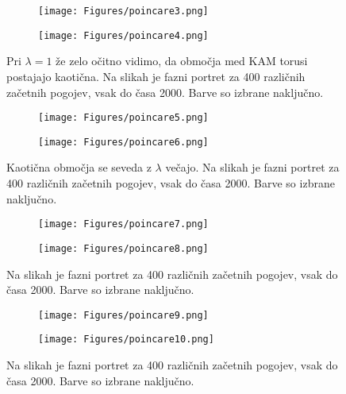 \documentclass{article}
\begin{document}
\begin{figure}[H]
\centering
\begin{subfigure}{.49\textwidth}
\texttt{[image: Figures/poincare3.png]}
\end{subfigure}
\begin{subfigure}{.49\textwidth}
\texttt{[image: Figures/poincare4.png]}
\end{subfigure}
\caption*{Pri $\lambda=1$ že zelo očitno vidimo, da območja med KAM torusi postajajo kaotična. Na slikah je fazni portret za 400 različnih začetnih pogojev, vsak do časa 2000. Barve so izbrane naključno.}
\end{figure} 

\begin{figure}[H]
\centering
\begin{subfigure}{.49\textwidth}
\texttt{[image: Figures/poincare5.png]}
\end{subfigure}
\begin{subfigure}{.49\textwidth}
\texttt{[image: Figures/poincare6.png]}
\end{subfigure}
\caption*{Kaotična območja se seveda z $\lambda$ večajo. Na slikah je fazni portret za 400 različnih začetnih pogojev, vsak do časa 2000. Barve so izbrane naključno.}
\end{figure} 

\begin{figure}[H]
\centering
\begin{subfigure}{.49\textwidth}
\texttt{[image: Figures/poincare7.png]}
\end{subfigure}
\begin{subfigure}{.49\textwidth}
\texttt{[image: Figures/poincare8.png]}
\end{subfigure}
\caption*{Na slikah je fazni portret za 400 različnih začetnih pogojev, vsak do časa 2000. Barve so izbrane naključno.}
\end{figure} 

\begin{figure}[H]
\centering
\begin{subfigure}{.49\textwidth}
\texttt{[image: Figures/poincare9.png]}
\end{subfigure}
\begin{subfigure}{.49\textwidth}
\texttt{[image: Figures/poincare10.png]}
\end{subfigure}
\caption*{Na slikah je fazni portret za 400 različnih začetnih pogojev, vsak do časa 2000. Barve so izbrane naključno.}
\end{figure} 
\end{document}
